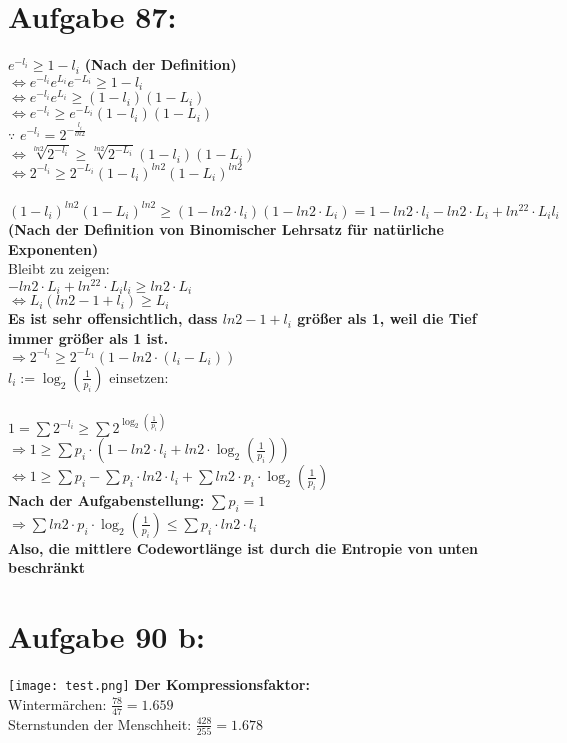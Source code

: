 \documentclass{article}
\begin{document}
\section{Aufgabe 87:}
$e^{-l_i}\geq1-l_i$ \textbf{(Nach der Definition)}\\
$\Leftrightarrow e^{-l_i}e^{L_i}e^{-L_i}\geq1-l_i$\\
$\Leftrightarrow e^{-l_i}e^{L_i}\geq(1-l_i)(1-L_i)$\\
$\Leftrightarrow e^{-l_i}\geq e^{-L_i}(1-l_i)(1-L_i)$\\
$\because$ $e^{-l_i}=2^{-\frac{l_i}{ln2}}$\\
$\Leftrightarrow \sqrt[ln2]{2^{-l_i}} \geq \sqrt[ln2]{2^{-L_i}}(1-l_i)(1-L_i)$\\
$\Leftrightarrow 2^{-l_i} \geq 2^{-L_i}(1-l_i)^{ln2}(1-L_i)^{ln2}$\\
\\
$(1-l_i)^{ln2}(1-L_i)^{ln2} \geq (1-ln2\cdot l_i)(1-{ln2}\cdot L_i) = 1 - ln2 \cdot l_i - ln2 \cdot L_i+ln^22\cdot L_il_i$\\ 
\textbf{(Nach der Definition von Binomischer Lehrsatz für natürliche Exponenten)}\\
Bleibt zu zeigen: \\
$-ln2\cdot L_i+ln^22 \cdot L_il_i \geq ln2 \cdot L_i$\\
$\Leftrightarrow L_i(ln2-1+l_i) \geq L_i$ \\
\textbf{Es ist sehr offensichtlich, dass $ln2-1+l_i$ größer als 1, weil die Tief immer größer als 1 ist.} \\
$\Rightarrow 2^{-l_i} \geq 2^{-L_1}(1-ln2 \cdot (l_i-L_i))$\\
$l_i := \log _2\left(\frac{1}{p_i}\right)$ einsetzen:\\
\\
$1=\sum 2^{-l_i} \geq \sum 2^{\log _2\left(\frac{1}{p_i}\right)}$\\
$\Rightarrow 1 \geq \sum p_i \cdot (1-ln2 \cdot l_i + ln2 \cdot \log _2\left(\frac{1}{p_i}\right))$\\
$\Leftrightarrow 1\geq \sum p_i - \sum p_i \cdot ln2\cdot l_i + \sum ln2 \cdot p_i \cdot \log _2\left(\frac{1}{p_i}\right)$\\
\textbf{Nach der Aufgabenstellung: }$\sum p_i = 1$\\
$\Rightarrow \sum ln2 \cdot p_i \cdot \log _2\left(\frac{1}{p_i}\right) \leq \sum p_i \cdot ln2\cdot l_i$\\
\textbf{Also, die mittlere Codewortlänge ist durch die Entropie von unten beschränkt}

\section{Aufgabe 90 b:}
\texttt{[image: test.png]}
\textbf{Der Kompressionsfaktor:}\\
Wintermärchen: $\frac{78}{47} = 1.659$\\
Sternstunden der Menschheit: $\frac{428}{255}= 1.678$
\end{document}

